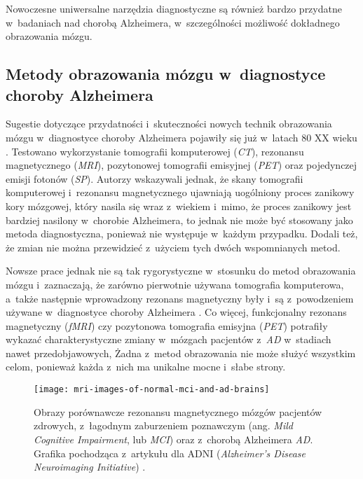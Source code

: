 Nowoczesne uniwersalne narzędzia diagnostyczne są również bardzo przydatne w~badaniach nad chorobą Alzheimera, w~szczególności możliwość dokładnego obrazowania mózgu.

\subsection{Metody obrazowania mózgu w~diagnostyce choroby Alzheimera}

Sugestie dotyczące przydatności i~skuteczności nowych technik obrazowania mózgu w~diagnostyce choroby Alzheimera pojawiły się już w~latach 80 XX wieku \cite{mcgeer1986brain}.
Testowano wykorzystanie tomografii komputerowej (\emph{CT}), rezonansu magnetycznego (\emph{MRI}), pozytonowej tomografii emisyjnej (\emph{PET}) oraz pojedynczej emisji fotonów (\emph{SP}).
Autorzy wskazywali jednak, że skany tomografii komputerowej i~rezonansu magnetycznego ujawniają uogólniony proces zanikowy kory mózgowej, który nasila się wraz z~wiekiem i~mimo, że proces zanikowy jest bardziej nasilony w~chorobie Alzheimera, to jednak nie może być stosowany jako metoda diagnostyczna, ponieważ nie występuje w~każdym przypadku.
Dodali też, że zmian nie można przewidzieć z~użyciem tych dwóch wspomnianych metod.

Nowsze prace jednak nie są tak rygorystyczne w~stosunku do metod obrazowania mózgu i~zaznaczają, że zarówno pierwotnie używana tomografia komputerowa, a~także następnie wprowadzony rezonans magnetyczny były i~są z~powodzeniem używane w~diagnostyce choroby Alzheimera \cite{johnson2012brain}.
Co więcej, funkcjonalny rezonans magnetyczny (\emph{fMRI}) czy pozytonowa tomografia emisyjna (\emph{PET}) potrafiły wykazać charakterystyczne zmiany w~mózgach pacjentów z~\emph{AD} w~stadiach nawet przedobjawowych,
Żadna z~metod obrazowania nie może służyć wszystkim celom, ponieważ każda z~nich ma unikalne mocne i~słabe strony.

\begin{figure}[ht]
  \texttt{[image: mri-images-of-normal-mci-and-ad-brains]}
  \caption[Obrazy porównawcze rezonansu magnetycznego mózgów pacjentów z~chorobą Alzheimera oraz zdrowych]{Obrazy porównawcze rezonansu magnetycznego mózgów pacjentów zdrowych, z~łagodnym zaburzeniem poznawczym (ang. \emph{Mild Cognitive Impairment}, lub \emph{MCI}) oraz z~chorobą Alzheimera \emph{AD}. Grafika pochodząca z~artykułu dla ADNI (\emph{Alzheimer's Disease Neuroimaging Initiative}) \cite{chandra2019magnetic}.}
  \label{mri-images-of-normal-mci-and-ad-brains}
\end{figure}

